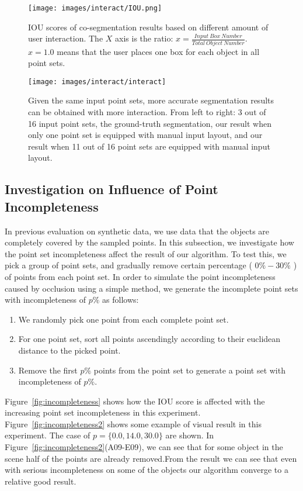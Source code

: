 \begin{figure}
	\centering
	\texttt{[image: images/interact/IOU.png]}
	\caption{IOU scores of co-segmentation results based on different amount of user interaction. The $X$ axis is the ratio: $x=\frac{Input~Box~Number}{Total~Object~Number}$. $x=1.0$ means that the user places one box for each object in all point sets.}
	\label{fig:interact_number}
\end{figure}

\begin{figure}
	\centering
	\texttt{[image: images/interact/interact]}
	\caption{Given the same input point sets, more accurate segmentation results can be obtained with more interaction. From left to right: 3 out of 16 input point sets, the ground-truth segmentation, our result when only one point set is equipped with manual input layout, and our result when 11 out of 16 point sets are equipped with manual input layout.
	}
	\label{fig:interact_vis}
\end{figure}

\subsection{Investigation on Influence of Point Incompleteness}
\label{sec:exp-incompleteness}
In previous evaluation on synthetic data, we use data that the objects are completely covered by the sampled points. 
%
In this subsection, we investigate how the point set incompleteness affect the result of our algorithm. 
%
To test this, we pick a group of point sets, and gradually remove certain percentage ( $0\%-30\%$ ) of points from each point set. In order to simulate the point incompleteness caused by occlusion using a simple method, we generate the incomplete point sets with incompleteness of $p\%$ as follows:
\begin{enumerate}
	\item We randomly pick one point from each complete point set. 
	\item For one point set, sort all points ascendingly according to their euclidean distance to the picked point.  
	\item Remove the first $p\%$ points from the point set to generate a point set with incompleteness of $p\%$.
\end{enumerate}
% 
Figure~\ref{fig:incompleteness} shows how the IOU score is affected with the increasing point set incompleteness in this experiment. 
Figure~\ref{fig:incompleteness2} shows some example of visual result in this experiment. The case of $p=\{0.0,14.0,30.0\}$ are shown. In Figure~\ref{fig:incompleteness2}(A09-E09), we can see that for some object in the scene half of the points are already removed.From the result we can see that even with serious incompleteness on some of the objects our algorithm converge to a relative good result.

